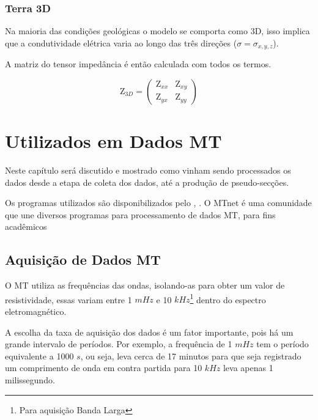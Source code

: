         
        \subsection{Terra 3D}
        Na maioria das condições geológicas o modelo se comporta como 3D, isso implica que a 
	    condutividade elétrica varia ao longo das três direções ($\sigma = \sigma_{x,y,z}$).
	    
	    A matriz do tensor impedância é então calculada com todos os termos. 
	    
	     \begin{equation}
	     \textrm{Z}_{3D} = \left (\begin{array}{cc}
	                               \textrm{Z}_{xx} & \textrm{Z}_{xy} \\
	                               \textrm{Z}_{yx} & \textrm{Z}_{yy}
	                              \end{array} \right)
	    \end{equation}

    \chapter{ Utilizados em Dados MT}
        \label{cap-proc_mt}
            
        Neste capítulo será discutido e mostrado como vinham sendo processados os dados \MT desde a etapa de coleta dos dados, até a produção de pseudo-secções. 
        
        Os programas utilizados são disponibilizados pelo  \citeauthor{mtnet}, \citeyearpar{mtnet}. O  MTnet é uma comunidade que une diversos programas para processamento de dados MT, para fins acadêmicos  
        
    \section{Aquisição de Dados MT}
        \label{sec_aquisicao_dados}
        O MT utiliza as frequências das ondas, isolando-as para obter um valor de resistividade, essas variam entre 1 $mHz$ e 10 $kHz$\footnote{Para aquisição Banda Larga} dentro do espectro eletromagnético.
        
        A escolha da taxa de aquisição dos dados é um fator importante, pois há um grande intervalo de períodos. Por exemplo, a frequência de 1 $mHz$ tem o período equivalente a 1000 $s$, ou seja, leva cerca de 17 minutos para que seja registrado um comprimento de onda em contra partida para 10 $kHz$ leva apenas 1 milissegundo.
        

